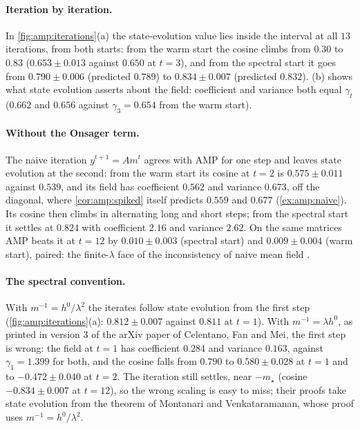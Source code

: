 \begin{refsection}
\paragraph{Iteration by iteration.} In \cref{fig:amp:iterations}(a) the state-evolution value lies inside the interval at all $13$ iterations, from both starts: from the warm start the cosine climbs from $0.30$ to $0.83$ ($0.653\pm0.013$ against $0.650$ at $t=3$), and from the spectral start it goes from $0.790\pm0.006$ (predicted $0.789$) to $0.834\pm0.007$ (predicted $0.832$). (b) shows what state evolution asserts about the field: coefficient and variance both equal $\gamma_t$ ($0.662$ and $0.656$ against $\gamma_3=0.654$ from the warm start).

\paragraph{Without the Onsager term.} The naive iteration $y^{t+1}=Am^t$ agrees with AMP for one step and leaves state evolution at the second: from the warm start its cosine at $t=2$ is $0.575\pm0.011$ against $0.539$, and its field has coefficient $0.562$ and variance $0.673$, off the diagonal, where \cref{cor:amp:spiked} itself predicts $0.559$ and $0.677$ (\cref{ex:amp:naive}). Its cosine then climbs in alternating long and short steps; from the spectral start it settles at $0.824$ with coefficient $2.16$ and variance $2.62$. On the same matrices AMP beats it at $t=12$ by $0.010\pm0.003$ (spectral start) and $0.009\pm0.004$ (warm start), paired: the finite-$\lambda$ face of the inconsistency of naive mean field \parencite{FanMeiMontanari2021}.

\paragraph{The spectral convention.} With $m^{-1}=h^0/\lambda^2$ the iterates follow state evolution from the first step (\cref{fig:amp:iterations}(a): $0.812\pm0.007$ against $0.811$ at $t=1$). With $m^{-1}=\lambda h^0$, as printed in version 3 of the arXiv paper of Celentano, Fan and Mei, the first step is wrong: the field at $t=1$ has coefficient $0.284$ and variance $0.163$, against $\gamma_1=1.399$ for both, and the cosine falls from $0.790$ to $0.580\pm0.028$ at $t=1$ and to $-0.472\pm0.040$ at $t=2$. The iteration still settles, near $-m_\star$ (cosine $-0.834\pm0.007$ at $t=12$), so the wrong scaling is easy to miss; their proofs take state evolution from the theorem of Montanari and Venkataramanan, whose proof uses $m^{-1}=h^0/\lambda^2$.


\end{refsection}
